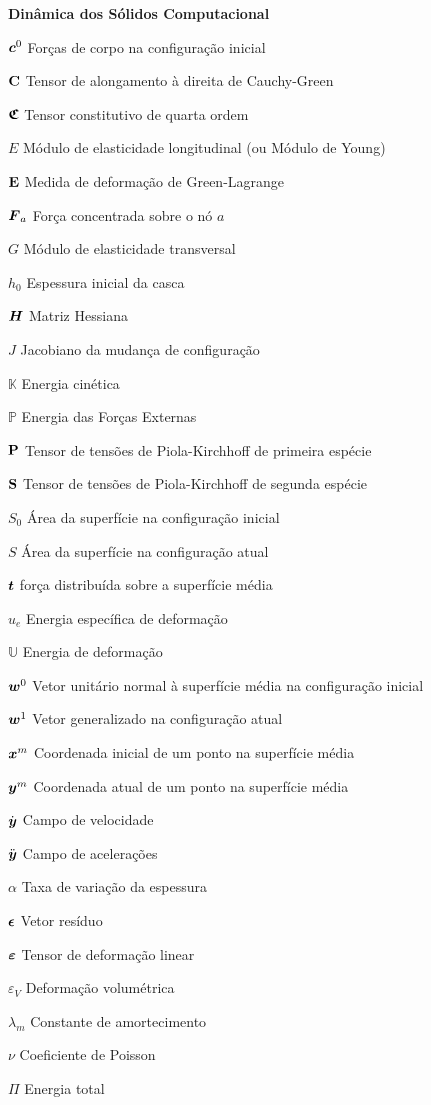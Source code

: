 \begin{simbolos}
    \item[\textbf{Dinâmica dos Sólidos Computacional}]
    \item[$\boldsymbol{c}^0$] Forças de corpo na configuração inicial
    \item[$\mathbf{C}$] Tensor de alongamento à direita de Cauchy-Green
    \item[$\boldsymbol{\mathfrak{C}}$] Tensor constitutivo de quarta ordem
    \item[$E$] Módulo de elasticidade longitudinal (ou Módulo de Young)
    \item[$\mathbf{E}$] Medida de deformação de Green-Lagrange
    \item[$\boldsymbol{F}_a$] Força concentrada sobre o nó $a$
    \item[$G$] Módulo de elasticidade transversal
    \item[$h_0$] Espessura inicial da casca
    \item[$\boldsymbol{H}$] Matriz Hessiana
    \item[$J$] Jacobiano da mudança de configuração
    \item[$\mathbb{K}$] Energia cinética
    \item[$\mathbb{P}$] Energia das Forças Externas
    \item[$\mathbf{P}$] Tensor de tensões de Piola-Kirchhoff de primeira espécie
    \item[$\mathbf{S}$] Tensor de tensões de Piola-Kirchhoff de segunda espécie
    \item[$S_0$] Área da superfície na configuração inicial
    \item[$S$] Área da superfície na configuração atual
    \item[$\boldsymbol{t}$] força distribuída sobre a superfície média
    \item[$u_e$] Energia específica de deformação
    \item[$\mathbb{U}$] Energia de deformação
    \item[$\boldsymbol{w}^0$] Vetor unitário normal à superfície média na configuração inicial
    \item[$\boldsymbol{w}^1$] Vetor generalizado na configuração atual
    \item[$\boldsymbol{x}^m$] Coordenada inicial de um ponto na superfície média
    \item[$\boldsymbol{y}^m$] Coordenada atual de um ponto na superfície média
    \item[$\dot{\boldsymbol{y}}$] Campo de velocidade
    \item[$\ddot{\boldsymbol{y}}$] Campo de acelerações
    \item[$\alpha$] Taxa de variação da espessura
    \item[$\boldsymbol{\epsilon}$] Vetor resíduo
    \item[$\boldsymbol{\varepsilon}$] Tensor de deformação linear
    \item[$\varepsilon_V$] Deformação volumétrica
    \item[$\lambda_m$] Constante de amortecimento
    \item[$\nu$] Coeficiente de Poisson
    \item[$\Pi$] Energia total


\end{simbolos}
